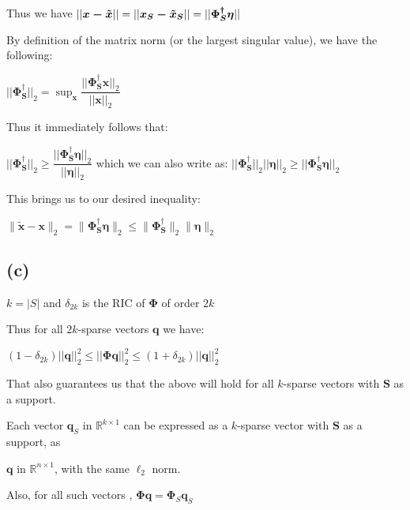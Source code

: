 \documentclass[fleqn, 11pt]{article}
\newcommand{\bs}[1]{\boldsymbol{#1}}
\newcommand{\pss}[0]{\boldsymbol{\Phi^{\dagger}_S}}
\begin{document}
\medskip

Thus we have 
$|| \bs{x-\Tilde{x}} || 
= || \bs{x_S-\Tilde{x}_S} ||
= || \pss \bs{\eta} ||
$

By definition of the matrix norm (or the largest singular value), we have the following:

\smallskip

$||\pss||_2 = \sup_{\bs{x}} \dfrac{||\pss \bs{x}||_2}{||\bs{x}||_2} $

\medskip

Thus it immediately follows that: 

$||\pss||_2 \geq  \dfrac{||\pss \bs{\eta}||_2}{||\bs{\eta}||_2} $ 
\hspace{10pt} which we can also write as: \hspace{5pt} 
$||\pss||_2 {||\bs{\eta}||_2} \geq  {||\pss \bs{\eta}||_2} $ 

\medskip

This brings us to our desired inequality:

\smallskip

$\|\boldsymbol{\tilde{x}}-\boldsymbol{x}\|_2 = \|\boldsymbol{\Phi^{\dagger}_S \eta}\|_2 \leq \|\boldsymbol{\Phi^{\dagger}_S}\|_2 \|\boldsymbol{\eta}\|_2$

\smallskip

\subsection*{(c)}

$k = |S|$ and $\delta_{2k}$ is the RIC of $\boldsymbol{\Phi}$ of order $2k$

\medskip

Thus for all $2k$-sparse vectors $\bs{q}$ we have: 

\begin{center}
    $(1-\delta_{2k}) || \bs{q} ||_2^2 \leq || \bs{ \Phi q }||_2^2 \leq (1+\delta_{2k}) 
|| \bs{q} ||_2^2    $

\end{center}

That also guarantees us that the above will hold for all $k$-sparse vectors with
$\bs{S}$ as a support.

Each vector $\bs{q}_{S}$  in $\mathbb{R}^{k \times 1}$ can be expressed as a 
$k$-sparse vector with $\bs{S}$ as a support, as 

$ \bs{q}$ in
$\mathbb{R}^{n \times 1}$, with the same $\ell_2$ norm.

\medskip

Also, for all such vectors , $ \bs{ \Phi q } = \bs{  \Phi}_S \bs{q}_{S}  $
\end{document}
